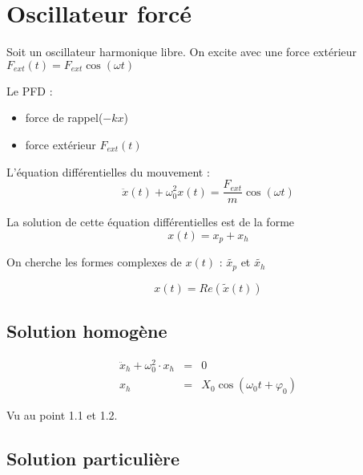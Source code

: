 \section{Oscillateur forcé}

Soit un oscillateur harmonique libre. On excite avec une force extérieur $F_{ext}(t) = F_{ext}\cos(\omega t)$

Le PFD :
\begin{itemize}
	\item force de rappel($-kx$)
	\item force extérieur $F_{ext}(t)$
\end{itemize}

L'équation différentielles du mouvement : \[\ddot{x}(t)+\omega_0^2 x(t) = \frac{F_{ext}}{m}\cos(\omega t)\]

La solution de cette équation différentielles est de la forme \[x(t) = x_p + x_h\]

On cherche les formes complexes de $x(t)$ : $\tilde{x_p}$ et $\tilde{x_h}$

\[x(t) = Re(\tilde{x}(t))\]

\subsection{Solution homogène}
\[\begin{array}{rcl}
		\ddot{x}_h + \omega_0^2 \cdot x_h &=& 0 \\
		x_h &=& X_0\cos(\omega_0 t + \varphi_0) 
	\end{array}
\]

Vu au point 1.1 et 1.2.

\subsection{Solution particulière}

